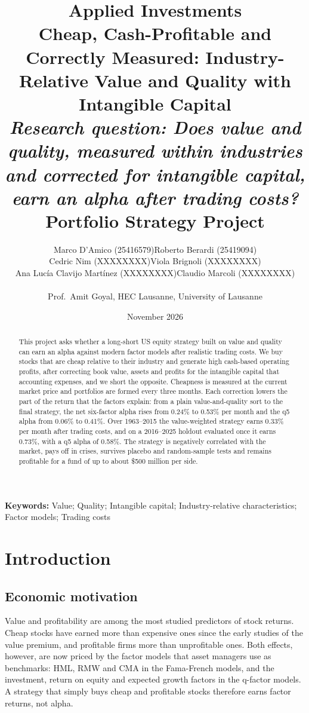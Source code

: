 \documentclass[12pt,a4paper]{article}
\title{%
    \Large \textbf{Applied Investments} \\
    \vspace{0.5cm}
    \LARGE \textbf{Cheap, Cash-Profitable and Correctly Measured: Industry-Relative Value and Quality with Intangible Capital} \\
    \vspace{0.3cm}
    \large \textit{Research question: Does value and quality, measured within industries and corrected for intangible capital, earn an alpha after trading costs?} \\
    \vspace{0.3cm}
    \large Portfolio Strategy Project
}
\author{%
    \normalsize\begin{tabular}{cc}
    Marco D'Amico (25416579) & Roberto Berardi (25419094) \\
    Cedric Nim (XXXXXXXX) & Viola Brignoli (XXXXXXXX) \\
    Ana Luc\'ia Clavijo Mart\'inez (XXXXXXXX) & Claudio Marcoli (XXXXXXXX) \\
    \end{tabular}\\[10pt]
    \small Prof.\ Amit Goyal, HEC Lausanne, University of Lausanne
}
\date{November 2026}
\begin{document}
\maketitle
\thispagestyle{empty}

\newpage
\thispagestyle{empty}
\begin{abstract}
\noindent
This project asks whether a long-short US equity strategy built on value and quality can earn an
alpha against modern factor models after realistic trading costs. We buy stocks that are cheap
relative to their industry and generate high cash-based operating profits, after correcting book
value, assets and profits for the intangible capital that accounting expenses, and we short the
opposite. Cheapness is measured at the current market price and portfolios are formed every three
months. Each correction lowers the part of the return that the factors explain: from a plain
value-and-quality sort to the final strategy, the net six-factor alpha rises from 0.24\% to 0.53\%
per month and the q5 alpha from 0.06\% to 0.41\%. Over 1963--2015 the value-weighted strategy earns
0.33\% per month after trading costs, and on a 2016--2025 holdout evaluated once it earns 0.73\%,
with a q5 alpha of 0.58\%. The strategy is negatively correlated with the market, pays off in
crises, survives placebo and random-sample tests and remains profitable for a fund of up to about
\$500 million per side.
\end{abstract}

\vspace{0.5cm}
\noindent\textbf{Keywords:} Value; Quality; Intangible capital; Industry-relative characteristics; Factor models; Trading costs

\newpage
\begin{singlespace}
\tableofcontents
\end{singlespace}
\thispagestyle{empty}

\newpage
{}

\section{Introduction}\label{sec:intro}

\subsection{Economic motivation}

Value and profitability are among the most studied predictors of stock returns. Cheap stocks have
earned more than expensive ones since the early studies of the value premium, and profitable firms
more than unprofitable ones. Both effects, however, are now priced by the factor models that asset
managers use as benchmarks: HML, RMW and CMA in the Fama-French models, and the investment, return
on equity and expected growth factors in the q-factor models. A strategy that simply buys cheap and
profitable stocks therefore earns factor returns, not alpha.
\end{document}
